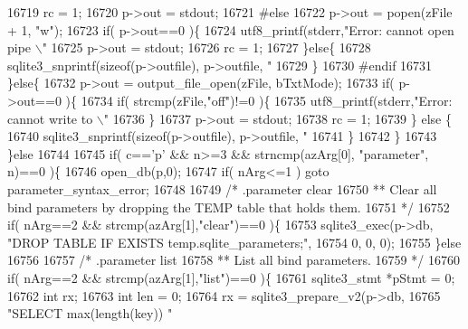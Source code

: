 \begin{DoxyCode}
{{{{{{{{{{{{{{{{{{{{{{{{{{{{{{{{{{{{{{{{{{{{{{{{{{{{{{{{{{{{{16719       rc = 1;
16720       p->out = stdout;
16721 \textcolor{preprocessor}{#else}
16722       p->out = popen(zFile + 1, \textcolor{stringliteral}{"w"});
16723       \textcolor{keywordflow}{if}( p->out==0 )\{
16724         utf8_printf(stderr,\textcolor{stringliteral}{"Error: cannot open pipe \(\backslash\)"%
16725         p->out = stdout;
16726         rc = 1;
16727       \}\textcolor{keywordflow}{else}\{
16728         sqlite3_snprintf(\textcolor{keyword}{sizeof}(p->outfile), p->outfile, \textcolor{stringliteral}{"%
16729       \}
16730 \textcolor{preprocessor}{#endif}
16731     \}\textcolor{keywordflow}{else}\{
16732       p->out = output_file_open(zFile, bTxtMode);
16733       \textcolor{keywordflow}{if}( p->out==0 )\{
16734         \textcolor{keywordflow}{if}( strcmp(zFile,\textcolor{stringliteral}{"off"})!=0 )\{
16735           utf8_printf(stderr,\textcolor{stringliteral}{"Error: cannot write to \(\backslash\)"%
16736         \}
16737         p->out = stdout;
16738         rc = 1;
16739       \} \textcolor{keywordflow}{else} \{
16740         sqlite3_snprintf(\textcolor{keyword}{sizeof}(p->outfile), p->outfile, \textcolor{stringliteral}{"%
16741       \}
16742     \}
16743   \}\textcolor{keywordflow}{else}
16744 
16745   \textcolor{keywordflow}{if}( c==\textcolor{charliteral}{'p'} && n>=3 && strncmp(azArg[0], \textcolor{stringliteral}{"parameter"}, n)==0 )\{
16746     open_db(p,0);
16747     \textcolor{keywordflow}{if}( nArg<=1 ) \textcolor{keywordflow}{goto} parameter\_syntax\_error;
16748 
16749     \textcolor{comment}{/* .parameter clear}
16750 \textcolor{comment}{    ** Clear all bind parameters by dropping the TEMP table that holds them.}
16751 \textcolor{comment}{    */}
16752     \textcolor{keywordflow}{if}( nArg==2 && strcmp(azArg[1],\textcolor{stringliteral}{"clear"})==0 )\{
16753       sqlite3_exec(p->db, \textcolor{stringliteral}{"DROP TABLE IF EXISTS temp.sqlite\_parameters;"},
16754                    0, 0, 0);
16755     \}\textcolor{keywordflow}{else}
16756 
16757     \textcolor{comment}{/* .parameter list}
16758 \textcolor{comment}{    ** List all bind parameters.}
16759 \textcolor{comment}{    */}
16760     \textcolor{keywordflow}{if}( nArg==2 && strcmp(azArg[1],\textcolor{stringliteral}{"list"})==0 )\{
16761       sqlite3_stmt *pStmt = 0;
16762       \textcolor{keywordtype}{int} rx;
16763       \textcolor{keywordtype}{int} len = 0;
16764       rx = sqlite3_prepare_v2(p->db,
16765              \textcolor{stringliteral}{"SELECT max(length(key)) "}
}}}}}}}}}}}}}}}}}}}}}}}}}}}}}}}}}}}}}}}}}}}}}}}}}}}}}}}}}}}}}}}}}
\end{DoxyCode}
